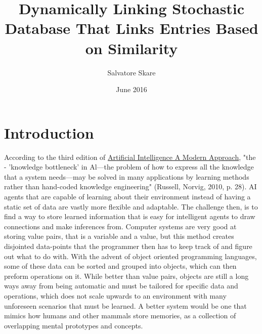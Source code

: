 \documentclass{report}
\title{Dynamically Linking Stochastic Database That Links Entries Based on Similarity}
\author{Salvatore Skare}
\date{June 2016}
\begin{document}
\begin{titlepage}
\maketitle
\end{titlepage}

\section{Introduction}
According to the third edition of \underline{Artificial Intelligence A Modern Approach}, "the - 'knowledge bottleneck' in Al—the problem of how to express all the knowledge that a system needs—may be solved in many applications by learning methods rather than hand-coded knowledge engineering" (Russell, Norvig, 2010, p. 28). AI agents that are capable of learning about their environment instead of having a static set of data are vastly more flexible and adaptable. The challenge then, is to find a way to store learned information that is easy for intelligent agents to draw connections and make inferences from. Computer systems are very good at storing value pairs, that is a variable and a value, but this method creates disjointed data-points that the programmer then has to keep track of and figure out what to do with. With the advent of object oriented programming languages, some of these data can be sorted and grouped into objects, which can then preform operations on it. While better than value pairs, objects are still a long ways away from being automatic and must be tailored for specific data and operations, which does not scale upwards to an environment with many unforeseen scenarios that must be learned. A better system would be one that mimics how humans and other mammals store memories, as a collection of overlapping mental prototypes and concepts. 
\end{document}
